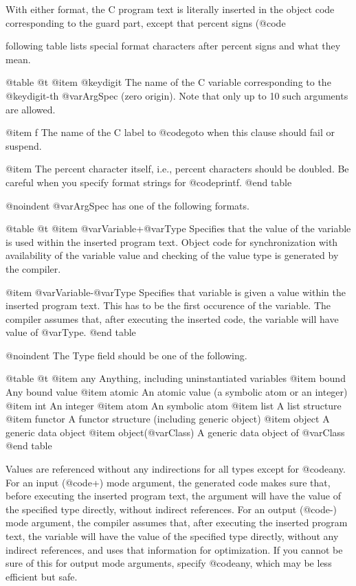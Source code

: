 With either format, the C program text is literally inserted in the
object code corresponding to the guard part, except that percent signs
(@code{%
following table lists special format characters after percent signs and
what they mean.

@table @t
@item @key{digit}
The name of the C variable corresponding to the @key{digit}-th
@var{ArgSpec} (zero origin).  Note that only up to 10 such arguments are
allowed.

@item f
The name of the C label to @code{goto} when this clause should fail or
suspend.

@item %
The percent character itself, i.e., percent characters should be
doubled.  Be careful when you specify format strings for @code{printf}.
@end table

@noindent
@var{ArgSpec } has one of the following formats.

@table @t
@item @var{Variable}+@var{Type}
Specifies that the value of the variable is used within the inserted
program text.  Object code for synchronization with availability of the
variable value and checking of the value type is generated by the
compiler.

@item @var{Variable}-@var{Type}
Specifies that variable is given a value within the inserted program
text.  This has to be the first occurence of the variable.  The compiler
assumes that, after executing the inserted code, the variable will have
value of @var{Type}.
@end table

@noindent
The Type field should be one of the following.

@table @t
@item any
Anything, including uninstantiated variables
@item bound
Any bound value
@item atomic
An atomic value (a symbolic atom or an integer)
@item int
An integer
@item atom
An symbolic atom
@item list
A list structure
@item functor
A functor structure (including generic object)
@item object
A generic data object
@item object(@var{Class})
A generic data object of @var{Class}
@end table

Values are referenced without any indirections for all types except for
@code{any}.  For an input (@code{+}) mode argument, the generated code
makes sure that, before executing the inserted program text, the
argument will have the value of the specified type directly, without
indirect references.  For an output (@code{-}) mode argument, the
compiler assumes that, after executing the inserted program text, the
variable will have the value of the specified type directly, without any
indirect references, and uses that information for optimization.  If you
cannot be sure of this for output mode arguments, specify @code{any},
which may be less efficient but safe.

}

